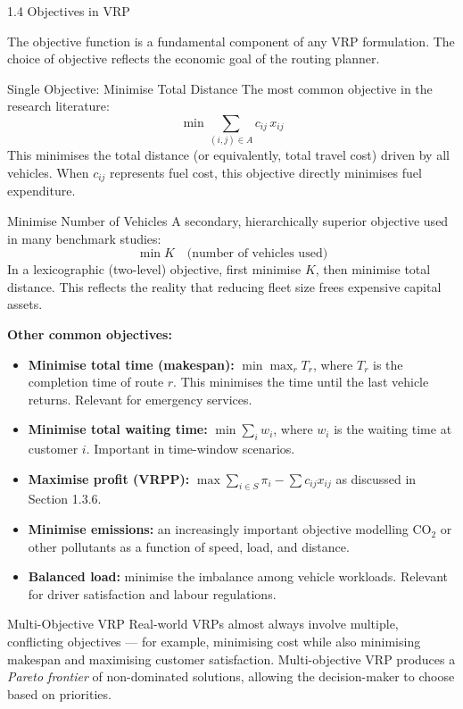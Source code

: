 \documentclass[aspectratio=169,10pt]{beamer}
\begin{document}
\begin{frame}[allowframebreaks]{1.4 Objectives in VRP}

The objective function is a fundamental component of any VRP formulation.  The
choice of objective reflects the economic goal of the routing planner.

\begin{block}{Single Objective: Minimise Total Distance}
The most common objective in the research literature:
\[
  \min \sum_{(i,j) \in A} c_{ij}\, x_{ij}
\]
This minimises the total distance (or equivalently, total travel cost) driven by
all vehicles.  When $c_{ij}$ represents fuel cost, this objective directly minimises
fuel expenditure.
\end{block}

\begin{block}{Minimise Number of Vehicles}
A secondary, hierarchically superior objective used in many benchmark studies:
\[
  \min K \quad \text{(number of vehicles used)}
\]
In a lexicographic (two-level) objective, first minimise $K$, then minimise total
distance.  This reflects the reality that reducing fleet size frees expensive capital
assets.
\end{block}

\framebreak

\textbf{Other common objectives:}

\begin{itemize}
  \item \textbf{Minimise total time (makespan):} $\min \max_r T_r$, where $T_r$ is the
        completion time of route $r$.  This minimises the time until the last vehicle
        returns.  Relevant for emergency services.

  \item \textbf{Minimise total waiting time:} $\min \sum_{i} w_i$, where $w_i$ is the
        waiting time at customer $i$.  Important in time-window scenarios.

  \item \textbf{Maximise profit (VRPP):} $\max \sum_{i \in S} \pi_i - \sum c_{ij} x_{ij}$
        as discussed in Section 1.3.6.

  \item \textbf{Minimise emissions:} an increasingly important objective modelling
        $\text{CO}_2$ or other pollutants as a function of speed, load, and distance.

  \item \textbf{Balanced load:} minimise the imbalance among vehicle workloads.
        Relevant for driver satisfaction and labour regulations.
\end{itemize}

\begin{alertblock}{Multi-Objective VRP}
Real-world VRPs almost always involve multiple, conflicting objectives --- for example,
minimising cost while also minimising makespan and maximising customer satisfaction.
Multi-objective VRP produces a \emph{Pareto frontier} of non-dominated solutions,
allowing the decision-maker to choose based on priorities.
\end{alertblock}

\end{frame}
\end{document}
